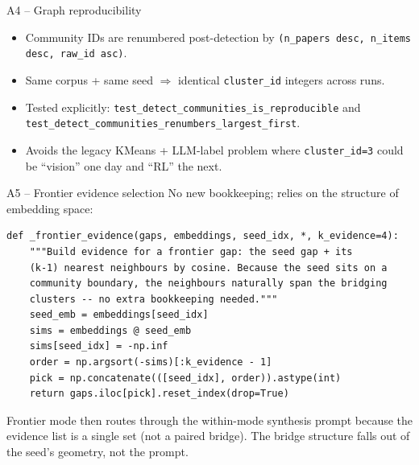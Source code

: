 \documentclass[10pt,aspectratio=169]{beamer}
\begin{document}
\begin{frame}{A4 -- Graph reproducibility}
  \begin{itemize}
    \item Community IDs are renumbered post-detection by
      \texttt{(n\_papers desc, n\_items desc, raw\_id asc)}.
    \item Same corpus + same seed $\Rightarrow$ identical \texttt{cluster\_id}
      integers across runs.
    \item Tested explicitly:
      \texttt{test\_detect\_communities\_is\_reproducible} and
      \texttt{test\_detect\_communities\_renumbers\_largest\_first}.
    \item Avoids the legacy KMeans + LLM-label problem where
      \texttt{cluster\_id=3} could be ``vision'' one day and ``RL'' the next.
  \end{itemize}
\end{frame}

\begin{frame}[fragile]{A5 -- Frontier evidence selection}
  No new bookkeeping; relies on the structure of embedding space:
  \begin{lstlisting}
def _frontier_evidence(gaps, embeddings, seed_idx, *, k_evidence=4):
    """Build evidence for a frontier gap: the seed gap + its
    (k-1) nearest neighbours by cosine. Because the seed sits on a
    community boundary, the neighbours naturally span the bridging
    clusters -- no extra bookkeeping needed."""
    seed_emb = embeddings[seed_idx]
    sims = embeddings @ seed_emb
    sims[seed_idx] = -np.inf
    order = np.argsort(-sims)[:k_evidence - 1]
    pick = np.concatenate(([seed_idx], order)).astype(int)
    return gaps.iloc[pick].reset_index(drop=True)
  \end{lstlisting}
  \footnotesize Frontier mode then routes through the within-mode synthesis
  prompt because the evidence list is a single set (not a paired
  bridge). The bridge structure falls out of the seed's geometry, not the prompt.
\end{frame}
\end{document}
